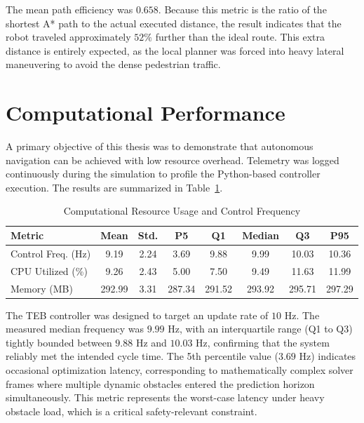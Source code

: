 The mean path efficiency was $0.658$. Because this metric is the ratio of the shortest A* path to the actual executed distance, the result indicates that the robot traveled approximately $52\%$ further than the ideal route. This extra distance is entirely expected, as the local planner was forced into heavy lateral maneuvering to avoid the dense pedestrian traffic.

\section{Computational Performance}
\label{sec:computational-performance}

A primary objective of this thesis was to demonstrate that autonomous navigation can be achieved with low resource overhead. Telemetry was logged continuously during the simulation to profile the Python-based controller execution. The results are summarized in Table~\ref{tab:resource-results}.

\begin{table}[htpb]
    \centering
    \caption{Computational Resource Usage and Control Frequency}
    \label{tab:resource-results}
    \begin{tabular}{lccccccc}
        \hline
        \textbf{Metric} & \textbf{Mean} & \textbf{Std.} & \textbf{P5} & \textbf{Q1} & \textbf{Median} & \textbf{Q3} & \textbf{P95} \\
        \hline
        Control Freq. (Hz) & 9.19 & 2.24 & 3.69 & 9.88 & 9.99 & 10.03 & 10.36 \\
        CPU Utilized (\%) & 9.26 & 2.43 & 5.00 & 7.50 & 9.49 & 11.63 & 11.99 \\
        Memory (MB) & 292.99 & 3.31 & 287.34 & 291.52 & 293.92 & 295.71 & 297.29 \\
        \hline
    \end{tabular}
\end{table}

The TEB controller was designed to target an update rate of $10\text{ Hz}$. The measured median frequency was $9.99\text{ Hz}$, with an interquartile range (Q1 to Q3) tightly bounded between $9.88\text{ Hz}$ and $10.03\text{ Hz}$, confirming that the system reliably met the intended cycle time. The 5th percentile value ($3.69\text{ Hz}$) indicates occasional optimization latency, corresponding to mathematically complex solver frames where multiple dynamic obstacles entered the prediction horizon simultaneously. This metric represents the worst-case latency under heavy obstacle load, which is a critical safety-relevant constraint.

